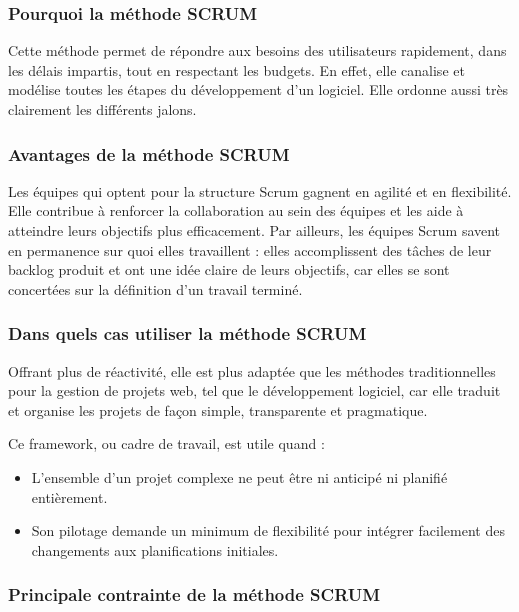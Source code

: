 \subsubsection{Pourquoi la méthode SCRUM}

Cette méthode permet de répondre aux besoins des utilisateurs rapidement, dans les délais
impartis, tout en respectant les budgets. En effet, elle canalise et modélise toutes les étapes du
développement d’un logiciel. Elle ordonne aussi très clairement les différents jalons.

\subsubsection{Avantages de la méthode SCRUM}

Les équipes qui optent pour la structure Scrum gagnent en agilité et en flexibilité. Elle contribue à renforcer la collaboration au sein des équipes et les aide à atteindre leurs objectifs plus efficacement. Par ailleurs, les équipes Scrum savent en permanence sur quoi elles travaillent : elles accomplissent des tâches de leur backlog produit et ont une idée claire de leurs objectifs, car elles se sont concertées sur la définition d’un travail \og terminé\fg.

\subsubsection{Dans quels cas utiliser la méthode SCRUM}

Offrant plus de réactivité, elle est plus adaptée que les méthodes traditionnelles pour la gestion de projets web, tel que le développement logiciel, car elle traduit et organise les projets de façon simple, transparente et pragmatique.

Ce framework, ou cadre de travail, est utile quand :

\vspace{1em}
\begin{itemize}
	\setlength\itemsep{1em}
	\item L’ensemble d’un projet complexe ne peut être ni anticipé ni planifié entièrement.
	\item Son pilotage demande un minimum de flexibilité pour intégrer facilement des changements aux planifications initiales.
\end{itemize}

\subsubsection{Principale contrainte de la méthode SCRUM}

